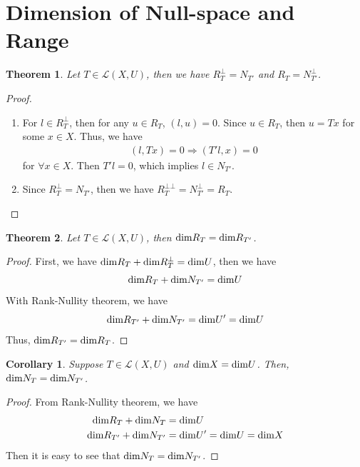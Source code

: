 \documentclass[11pt]{book}
\newtheorem{theorem}{Theorem}[section]
\newtheorem{corollary}{Corollary}[theorem]
\theoremstyle{definition}
\numberwithin{equation}{chapter}
\begin{document}
\section{Dimension of Null-space and Range}
\begin{theorem}
Let $T\in \mathscr{L}(X,U)$, then we have $R_T^\bot = N_{T'}$ and $R_T = N_{T'}^\bot$.
\end{theorem}
\begin{proof}
~\begin{enumerate}[label=(\alph*)]
    \item For $l\in R_T^\bot$, then for any $u\in R_T$, $(l,u) = 0$. Since $u\in R_T$, then $u = T x$ for some $x\in X$. Thus, we have
    \begin{align*}
        (l, T x) = 0 \Rightarrow (T' l, x) = 0
    \end{align*}
    for $\forall x\in X$. Then $T' l = 0$, which implies $l\in N_{T'}$.
    \item Since $R_T^\bot = N_{T'}$, then we have $R_T^{\bot\bot} = N_{T'}^\bot = R_T$.
\end{enumerate}
\end{proof}

\medskip

\begin{theorem}
Let $T\in \mathscr{L}(X,U)$, then ${\rm dim}R_T = {\rm dim}R_{T'}$.
\end{theorem}
\begin{proof}
First, we have ${\rm dim}R_T + {\rm dim}R_T^\bot = {\rm dim}U$, then we have $${\rm dim}R_T + {\rm dim}N_{T'} = {\rm dim}U$$
With Rank-Nullity theorem, we have $${\rm dim}R_{T'} + {\rm dim}N_{T'} = {\rm dim}U' = {\rm dim}U$$ 
Thus, ${\rm dim}R_{T'} = {\rm dim}R_{T}$.
\end{proof}

\medskip

\begin{corollary}
Suppose $T\in \mathscr{L}(X,U)$ and ${\rm dim} X = {\rm dim} U$. Then, ${\rm dim}N_T = {\rm dim}N_{T'}$.
\end{corollary}
\begin{proof}
From Rank-Nullity theorem, we have 
\begin{align*}
    {\rm dim}R_T + {\rm dim}N_T & = {\rm dim}U \\
    {\rm dim}R_{T'} + {\rm dim}N_{T'} & = {\rm dim}U' = {\rm dim}U = {\rm dim}X
\end{align*}
Then it is easy to see that ${\rm dim}N_T = {\rm dim}N_{T'}$.
\end{proof}
\end{document}
